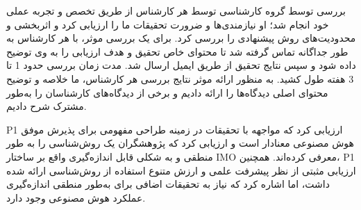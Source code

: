 \documentclass[a4paper,10pt]{article}
\begin{document}
                    بررسی توسط گروه کارشناسی توسط هر کارشناس از طریق تخصص و تجربه عملی خود انجام شد؛ او نیازمندی‌ها و ضرورت تحقیقات ما را ارزیابی کرد و اثربخشی و محدودیت‌های روش پیشنهادی را بررسی کرد. برای یک بررسی موثر، با هر کارشناس به طور جداگانه تماس گرفته شد تا محتوای خاص تحقیق و هدف ارزیابی را به وی توضیح داده شود و سپس نتایج تحقیق از طریق ایمیل ارسال شد. مدت زمان بررسی حدود 1 تا 3 هفته طول کشید. به منظور ارائه موثر نتایج بررسی هر کارشناس، ما خلاصه و توضیح محتوای اصلی دیدگاه‌ها را ارائه دادیم و برخی از دیدگاه‌های کارشناسان را به‌طور مشترک شرح دادیم.

                    P1 ارزیابی کرد که مواجهه با تحقیقات در زمینه طراحی مفهومی برای پذیرش موفق هوش مصنوعی معنادار است و ارزیابی کرد که پژوهشگران یک روش‌شناسی را به طور منطقی و به شکلی قابل اندازه‌گیری واقع بر ساختار IMO معرفی کرده‌اند. همچنین، P1 ارزیابی مثبتی از نظر پیشرفت علمی و ارزش متنوع استفاده از روش‌شناسی ارائه شده داشت، اما اشاره کرد که نیاز به تحقیقات اضافی برای به‌طور منطقی اندازه‌گیری عملکرد هوش مصنوعی وجود دارد.
\end{document}
